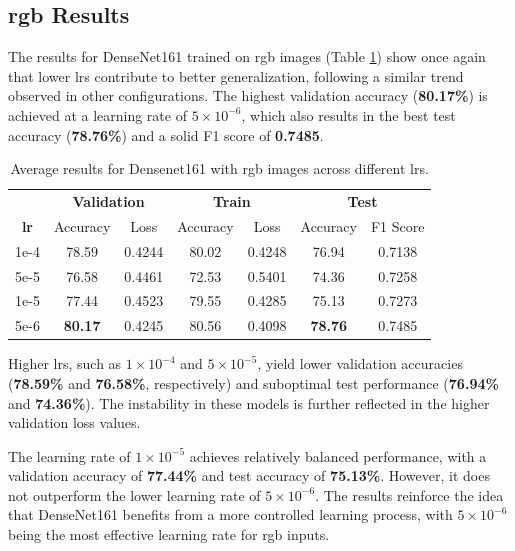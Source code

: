 \subsection{\gls{rgb} Results}

The results for DenseNet161 trained on \gls{rgb} images (Table \ref{tab:densenet161_rgb}) 
show once again that lower \glspl{lr} contribute to better generalization, following a 
similar trend observed in other configurations. The highest validation accuracy 
(\textbf{80.17\%}) is achieved at a learning rate of $5\times10^{-6}$, which also 
results in the best test accuracy (\textbf{78.76\%}) and a solid F1 score of 
\textbf{0.7485}.

\begin{table}[h]
    \centering
    \renewcommand{\arraystretch}{1.3}
    \setlength{\tabcolsep}{8pt}
    \begin{tabular}{|c|cccccc|}
        \hline
        & \multicolumn{2}{c}{\textbf{Validation}} & \multicolumn{2}{c}{\textbf{Train}} & \multicolumn{2}{c|}{\textbf{Test}} \\
        \textbf{\gls{lr}} & Accuracy & Loss & Accuracy & Loss & Accuracy & F1 Score \\
        \hline
        1e-4 & 78.59          & 0.4244 & 80.02 & 0.4248 & 76.94 & 0.7138 \\
        5e-5 & 76.58          & 0.4461 & 72.53  & 0.5401 & 74.36 & 0.7258 \\
        1e-5 & 77.44          & 0.4523 & 79.55  & 0.4285 & 75.13 & 0.7273 \\
        5e-6 & \textbf{80.17} & 0.4245 & 80.56 & 0.4098 & \textbf{78.76} & 0.7485 \\
        \hline
    \end{tabular}
    \caption{Average results for Densenet161 with \gls{rgb} images across different \glspl{lr}.}
    \label{tab:densenet161_rgb}
\end{table}

Higher \glspl{lr}, such as $1\times10^{-4}$ and $5\times10^{-5}$, yield lower 
validation accuracies (\textbf{78.59\%} and \textbf{76.58\%}, respectively) and 
suboptimal test performance (\textbf{76.94\%} and \textbf{74.36\%}). The instability 
in these models is further reflected in the higher validation loss values. 

The learning rate of $1\times10^{-5}$ achieves relatively balanced performance, with a 
validation accuracy of \textbf{77.44\%} and test accuracy of \textbf{75.13\%}. However, 
it does not outperform the lower learning rate of $5\times10^{-6}$. The results 
reinforce the idea that DenseNet161 benefits from a more controlled learning process, with 
$5\times10^{-6}$ being the most effective learning rate for \gls{rgb} inputs.


